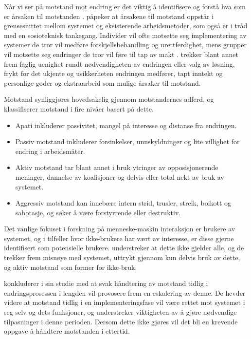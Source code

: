 \noindent
Når vi ser på motstand mot endring er det viktig å identifisere og forstå hva som er årsaken til motstanden \citep{Lapointe05}. \citet{Timmons03} påpeker at årsakene til motstand oppstår i grensesnittet mellom systemet og eksisterende arbeidsmetoder, som også er i tråd med en sosioteknisk tankegang. Individer vil ofte motsette seg implementering av systemer de tror vil medføre forskjellsbehandling og urettferdighet, mens grupper vil motsette seg endringer de tror vil føre til tap av makt \citep{Lapointe05}. \citet{Jacobsen12} trekker blant annet frem faglig uenighet rundt nødvendigheten av endringen eller valg av løsning, frykt for det ukjente og usikkerheten endringen medfører, tapt inntekt og personlige goder og ekstraarbeid som mulige årsaker til motstand.
 
\noindent
Motstand synliggjøres hovedsakelig gjennom motstandernes adferd, og \citet{Lapointe05} klassifiserer motstand i fire nivåer basert på dette.
 
\begin{itemize}
\item Apati inkluderer passivitet, mangel på interesse og distanse fra endringen.
\item Passiv motstand inkluderer forsinkelser, unnskyldninger og lite villighet for endring i arbeidsmåter.
\item Aktiv motstand tar blant annet i bruk ytringer av opposisjonerende meninger, dannelse av koalisjoner og delvis eller total nekt av bruk av systemet.
\item Aggressiv motstand kan innebære intern strid, trusler, streik, boikott og sabotasje, og søker å være forstyrrende eller destruktiv.
\end{itemize}
 
\noindent
Det vanlige fokuset i forskning på menneske-maskin interaksjon er brukere av systemet, og i tilfeller hvor ikke-brukere har vært av interesse, er disse gjerne identifisert som potensielle brukere. \citet{Satchell09} understreker at dette ikke gjelder alle, og de trekker frem misnøye med systemet, uttrykt gjennom kun delvis bruk av dette, og aktiv motstand som former for ikke-bruk.
 
\noindent
\citet{Lapointe05} konkluderer i sin studie med at svak håndtering av motstand tidlig i endringsprosessen i lengden vil provosere frem en eskalering av denne. De hevder videre at motstand tidlig i en implementeringsfase vil være rettet mot systemet i seg selv og dets funksjoner, og understreker viktigheten av å gjøre nødvendige tilpasninger i denne perioden. Dersom dette ikke gjøres vil det bli en krevende oppgave å håndtere motstanden i ettertid.
 
